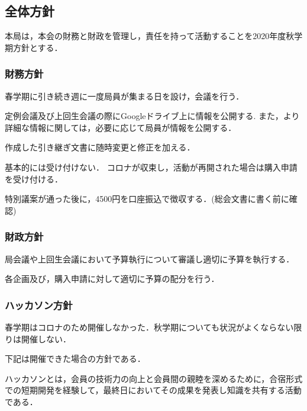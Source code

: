 \subsection*{全体方針}



本局は，本会の財務と財政を管理し，責任を持って活動することを2020年度秋学期方針とする．


\subsubsection*{財務方針}

春学期に引き続き週に一度局員が集まる日を設け，会議を行う．

定例会議及び上回生会議の際にGoogleドライブ上に情報を公開する.
また，より詳細な情報に関しては，必要に応じて局員が情報を公開する．

作成した引き継ぎ文書に随時変更と修正を加える．

基本的には受け付けない．
コロナが収束し，活動が再開された場合は購入申請を受け付ける．

特別議案が通った後に，4500円を口座振込で徴収する．(総会文書に書く前に確認)


\subsubsection*{財政方針}

局会議や上回生会議において予算執行について審議し適切に予算を執行する．

各企画及び，購入申請に対して適切に予算の配分を行う．


\subsubsection*{ハッカソン方針}
春学期はコロナのため開催しなかった．秋学期についても状況がよくならない限りは開催しない．

下記は開催できた場合の方針である．

ハッカソンとは，会員の技術力の向上と会員間の親睦を深めるために，合宿形式での短期開発を経験して，最終日においてその成果を発表し知識を共有する活動である．

